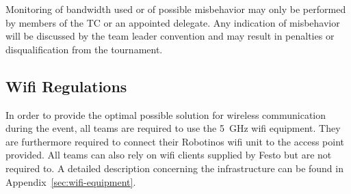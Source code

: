 \documentclass[12pt,twoside]{article}
\newenvironment{rulechange}{}{}
\begin{document}
Monitoring of bandwidth used or of possible misbehavior may only be
performed by members of the \ac{TC} or an appointed delegate.
Any indication of misbehavior will be discussed by the team leader
convention and may result in penalties or disqualification from the
tournament.



\subsection{Wifi Regulations}
\label{sec:wifi-regulations}
In order to provide the optimal possible solution for wireless
communication during the event, all teams are required to use the
\SI{5}{\giga\hertz} wifi equipment. They are furthermore required to
connect their Robotinos wifi unit to the access point provided. All
teams can also rely on wifi clients supplied by Festo but are not
required to. A detailed description concerning the infrastructure can
be found in Appendix~\ref{sec:wifi-equipment}.

\end{document}
